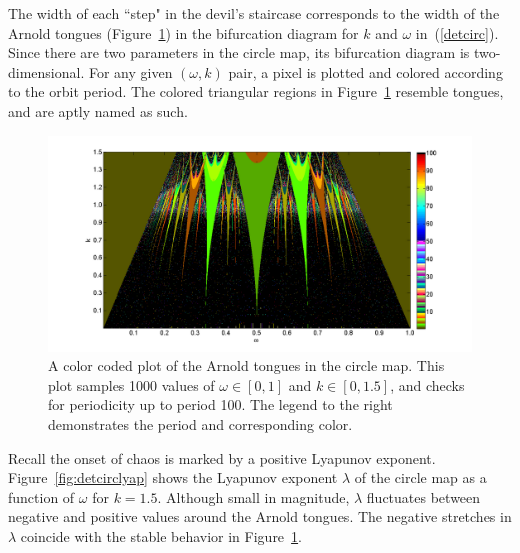 The width of each ``step" in the devil's staircase corresponds to the width of the Arnold
tongues (Figure~\ref{fig:dettongues}) in the bifurcation diagram for
$k$ and $\omega$ in~(\ref{detcirc}). Since there are two parameters in
the circle map, its bifurcation diagram is two-dimensional. For any
given $(\omega,k)$ pair, a pixel is plotted and colored according to
the orbit period. The colored
triangular regions in Figure~\ref{fig:dettongues} resemble tongues,
and are aptly named as such. 
\begin{figure}[!h]
\caption[The Arnold tongues for the deterministic circle map]{A color coded
  plot of the Arnold tongues in the circle map. This plot samples 1000 values of $\omega
  \in [0,1]$ and $k \in
  [0,1.5]$, and checks for periodicity up to period 100. The legend
  to the right demonstrates the period and corresponding
  color.}\label{fig:dettongues}
	\begin{center}
		\includegraphics[scale=0.45]{figs/tongues_1000_det.png}
	\end{center}
\end{figure}
Recall the onset of chaos is marked by a positive Lyapunov
exponent. Figure~\ref{fig:detcirclyap} shows the Lyapunov exponent
$\lambda$ of
the circle map as a function of $\omega$ for $k=1.5$. Although small in
magnitude, $\lambda$ fluctuates between negative and positive
values around the Arnold tongues. The negative stretches in $\lambda$
coincide with the stable behavior in Figure~\ref{fig:dettongues}.  

